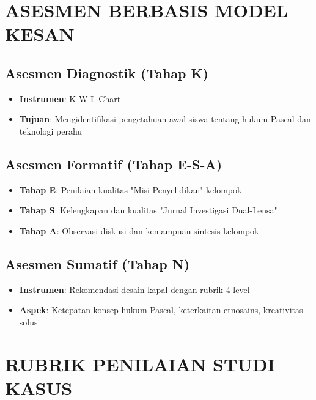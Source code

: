\documentclass[12pt,a4paper]{article}
\begin{document}
\section{ASESMEN BERBASIS MODEL KESAN}

\subsection{Asesmen Diagnostik (Tahap K)}
\begin{itemize}
\item \textbf{Instrumen}: K-W-L Chart
\item \textbf{Tujuan}: Mengidentifikasi pengetahuan awal siswa tentang hukum Pascal dan teknologi perahu
\end{itemize}

\subsection{Asesmen Formatif (Tahap E-S-A)}
\begin{itemize}
\item \textbf{Tahap E}: Penilaian kualitas "Misi Penyelidikan" kelompok
\item \textbf{Tahap S}: Kelengkapan dan kualitas "Jurnal Investigasi Dual-Lensa"
\item \textbf{Tahap A}: Observasi diskusi dan kemampuan sintesis kelompok
\end{itemize}

\subsection{Asesmen Sumatif (Tahap N)}
\begin{itemize}
\item \textbf{Instrumen}: Rekomendasi desain kapal dengan rubrik 4 level
\item \textbf{Aspek}: Ketepatan konsep hukum Pascal, keterkaitan etnosains, kreativitas solusi
\end{itemize}

\section{RUBRIK PENILAIAN STUDI KASUS}
\end{document}
